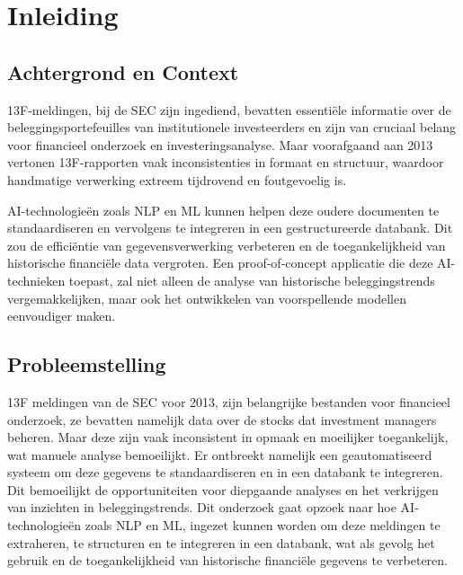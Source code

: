 


% 
\section{Inleiding}
\label{sec:inleiding}
\subsection{Achtergrond en Context}

13F-meldingen, bij de SEC zijn ingediend, bevatten essentiële informatie over de beleggingsportefeuilles van institutionele investeerders en zijn van cruciaal belang voor financieel onderzoek en investeringsanalyse. Maar voorafgaand aan 2013 vertonen 13F-rapporten vaak inconsistenties in formaat en structuur, waardoor handmatige verwerking extreem tijdrovend en foutgevoelig is. 

AI-technologieën zoals NLP en ML kunnen helpen deze oudere documenten te standaardiseren en vervolgens te integreren in een gestructureerde databank. Dit zou de efficiëntie van gegevensverwerking verbeteren en de toegankelijkheid van historische financiële data vergroten. Een proof-of-concept applicatie die deze AI-technieken toepast, zal niet alleen de analyse van historische beleggingstrends vergemakkelijken, maar ook het ontwikkelen van voorspellende modellen eenvoudiger maken.

\subsection{Probleemstelling}

13F meldingen van de SEC voor 2013, zijn belangrijke bestanden voor financieel onderzoek, ze bevatten namelijk data over de stocks dat investment managers beheren. Maar deze zijn vaak inconsistent in opmaak en moeilijker toegankelijk, wat manuele analyse bemoeilijkt. Er ontbreekt namelijk een geautomatiseerd systeem om deze gegevens te standaardiseren en in een databank te integreren. Dit bemoeilijkt de opportuniteiten voor diepgaande analyses en het verkrijgen van inzichten in beleggingstrends. Dit onderzoek gaat opzoek naar hoe AI-technologieën zoals NLP en ML, ingezet kunnen worden om deze meldingen te extraheren, te structuren en te integreren in een databank, wat als gevolg het gebruik en de toegankelijkheid van historische financiële gegevens te verbeteren.

